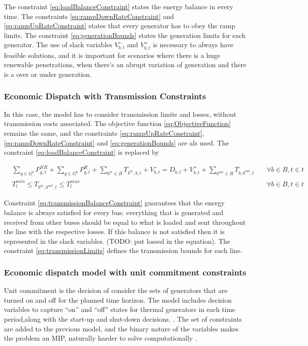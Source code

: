 \documentclass[12pt,LUDisStyle,twosided]{book}
\begin{document}
The constraint \ref{eq:loadBalanceConstraint} states the energy balance in every time. The constraints \ref{eq:rampDownRateConstraint} and \ref{eq:rampUpRateConstraint} states that every generator has to obey the ramp limits. The constraint \ref{eq:generationBounds} states the generation limits for each generator. The use of slack variables $V^{-}_{b,t}$ and $V^{+}_{b,t}$ is necessary to always have feasible solutions, and it is important for scenarios where there is a huge renewable penetrations, when there's an abrupt variation of generation and there is a over or under generation.   

\subsubsection{Economic Dispatch with Transmission Constraints}

In this case, the model has to consider transmission limits and losses, without transmission costs associated. The objective function \ref{eq:ObjectiveFunction} remains the same, and the constraints \ref{eq:rampUpRateConstraint}, \ref{eq:rampDownRateConstraint} and \ref{eq:generationBounds} are als used. The constraint \ref{eq:loadBalanceConstraint} is replaced by  

\begin{subequations}\label{model:edTransmissionConstraints}
\begin{alignat}{4}
&\sum_{g \in G^{b}} P^{NR}_{g,t} + \sum_{g \in G^{b}} P^{R}_{g,t} + \sum_{b^{in} \in B} T_{b^{in},b,t} + V^{-}_{b,t} = D_{b,t}  + V^{+}_{b,t} + \sum_{b^{out} \in B} T_{b,b^{out},t}  &~& \forall b \in B, t \in t \label{eq:transmissionBalanceConstraint} \\
& T^{min}_{l} \leq T_{b^{in},b^{out},t} \leq T^{max}_{l}  &~& \forall b \in B, t \in t \label{eq:transmissionLimits}
\end{alignat} 
\end{subequations}

Constraint \ref{eq:transmissionBalanceConstraint} guarantees that the energy balance is always satisfied for every bus: everything that is generated and received from other buses should be equal to what is loaded and sent throughout the line with the respective losses. If this balance is not satisfied then it is represented in the slack variables. (TODO: put lossed in the equation). The constraint \ref{eq:transmissionLimits} defines the transmission bounds for each line.

\subsubsection{Economic dispatch model with unit commitment constraints}
Unit commitment is the decision of consider the sets of generators that are turned on and off for the planned time horizon. The model includes decision variables to capture ``on'' and ``off'' states for thermal generators in each time period,along with the start-up and shut-down decisions. \citep{palmintier}. The set of constraints are added to the previous model, and the binary nature of the variables makes the problem an MIP, naturally harder to solve computationally \cite{james}. 
\end{document}

